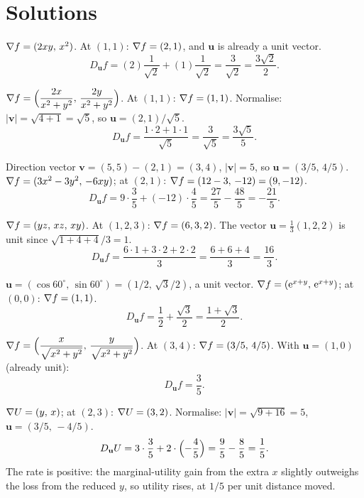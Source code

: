 \section{Solutions}

\begin{solutions}
  \item $\nabla f=(2xy,\,x^{2})$. At $(1,1)$: $\nabla f=(2,1)$, and
        $\mathbf{u}$ is already a unit vector.
        \[
          D_{\mathbf{u}}f=(2)\frac{1}{\sqrt{2}}+(1)\frac{1}{\sqrt{2}}
            =\frac{3}{\sqrt{2}}=\frac{3\sqrt{2}}{2} .
        \]

  \item $\nabla f=\Bigl(\dfrac{2x}{x^{2}+y^{2}},\,
        \dfrac{2y}{x^{2}+y^{2}}\Bigr)$. At $(1,1)$: $\nabla f=(1,1)$.
        Normalise: $|\mathbf{v}|=\sqrt{4+1}=\sqrt{5}$, so
        $\mathbf{u}=(2,1)/\sqrt{5}$.
        \[
          D_{\mathbf{u}}f=\frac{1\cdot 2+1\cdot 1}{\sqrt{5}}
            =\frac{3}{\sqrt{5}}=\frac{3\sqrt{5}}{5} .
        \]

  \item Direction vector $\mathbf{v}=(5,5)-(2,1)=(3,4)$,
        $|\mathbf{v}|=5$, so $\mathbf{u}=(3/5,\,4/5)$.
        $\nabla f=(3x^{2}-3y^{2},\,-6xy)$; at $(2,1)$:
        $\nabla f=(12-3,\,-12)=(9,-12)$.
        \[
          D_{\mathbf{u}}f=9\cdot\frac{3}{5}+(-12)\cdot\frac{4}{5}
            =\frac{27}{5}-\frac{48}{5}=-\frac{21}{5} .
        \]

  \item $\nabla f=(yz,\,xz,\,xy)$. At $(1,2,3)$: $\nabla f=(6,3,2)$. The
        vector $\mathbf{u}=\tfrac13(1,2,2)$ is unit since
        $\sqrt{1+4+4}/3=1$.
        \[
          D_{\mathbf{u}}f=\frac{6\cdot 1+3\cdot 2+2\cdot 2}{3}
            =\frac{6+6+4}{3}=\frac{16}{3} .
        \]

  \item $\mathbf{u}=(\cos 60^{\circ},\,\sin 60^{\circ})
        =(1/2,\,\sqrt{3}/2)$, a unit vector.
        $\nabla f=(\mathrm{e}^{x+y},\,\mathrm{e}^{x+y})$; at $(0,0)$:
        $\nabla f=(1,1)$.
        \[
          D_{\mathbf{u}}f=\frac{1}{2}+\frac{\sqrt{3}}{2}
            =\frac{1+\sqrt{3}}{2} .
        \]

  \item $\nabla f=\Bigl(\dfrac{x}{\sqrt{x^{2}+y^{2}}},\,
        \dfrac{y}{\sqrt{x^{2}+y^{2}}}\Bigr)$. At $(3,4)$:
        $\nabla f=(3/5,\,4/5)$. With $\mathbf{u}=(1,0)$ (already unit):
        \[
          D_{\mathbf{u}}f=\frac{3}{5} .
        \]

  \item $\nabla U=(y,\,x)$; at $(2,3)$: $\nabla U=(3,2)$. Normalise:
        $|\mathbf{v}|=\sqrt{9+16}=5$, $\mathbf{u}=(3/5,\,-4/5)$.
        \[
          D_{\mathbf{u}}U=3\cdot\frac{3}{5}+2\cdot\Bigl(-\frac{4}{5}\Bigr)
            =\frac{9}{5}-\frac{8}{5}=\frac{1}{5} .
        \]
        The rate is positive: the marginal-utility gain from the extra
        $x$ slightly outweighs the loss from the reduced $y$, so utility
        rises, at $1/5$ per unit distance moved.


\end{solutions}
